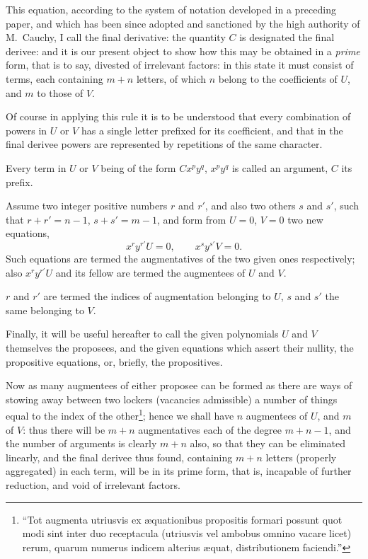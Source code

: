 \documentclass[11pt]{article}
\newcommand{\sourcepage}[1]{\marginpar{\scriptsize p.~#1}}
\begin{document}
This equation, according to the system of notation developed in a preceding paper, and which has been since adopted and sanctioned by the high authority of M.~Cauchy, I call the final derivative: the quantity $C$ is designated the final derivee: and it is our present object to show how this may be obtained in a \emph{prime} form, that is to say, divested of irrelevant factors: in this state it must consist of terms, each containing $m+n$ letters, of which $n$ belong to the coefficients of $U$, and $m$ to those of $V$.

Of course in applying this rule it is to be understood that every combination of powers in $U$ or $V$ has a single letter prefixed for its coefficient, and that in the final derivee powers are represented by repetitions of the same character.

Every term in $U$ or $V$ being of the form $Cx^py^q$, $x^py^q$ is called an argument, $C$ its prefix.

Assume two integer positive numbers $r$ and $r'$, and also two others $s$ and $s'$, such that $r+r'=n-1$, $s+s'=m-1$, and form from $U=0$, $V=0$ two new equations,
\[
 x^r y^{r'}U=0,\qquad x^s y^{s'}V=0.
\]
Such equations are termed the augmentatives of the two given ones respectively; also $x^r y^{r'}U$ and its fellow are termed the augmentees of $U$ and $V$.

\sourcepage{76}
$r$ and $r'$ are termed the indices of augmentation belonging to $U$, $s$ and $s'$ the same belonging to $V$.

Finally, it will be useful hereafter to call the given polynomials $U$ and $V$ themselves the proposees, and the given equations which assert their nullity, the propositive equations, or, briefly, the propositives.

Now as many augmentees of either proposee can be formed as there are ways of stowing away between two lockers (vacancies admissible) a number of things equal to the index of the other\footnote{``Tot augmenta utriusvis ex \ae quationibus propositis formari possunt quot modi sint inter duo receptacula (utriusvis vel ambobus omnino vacare licet) rerum, quarum numerus indicem alterius \ae quat, distributionem faciendi.''}; hence we shall have $n$ augmentees of $U$, and $m$ of $V$: thus there will be $m+n$ augmentatives each of the degree $m+n-1$, and the number of arguments is clearly $m+n$ also, so that they can be eliminated linearly, and the final derivee thus found, containing $m+n$ letters (properly aggregated) in each term, will be in its prime form, that is, incapable of further reduction, and void of irrelevant factors.
\end{document}
